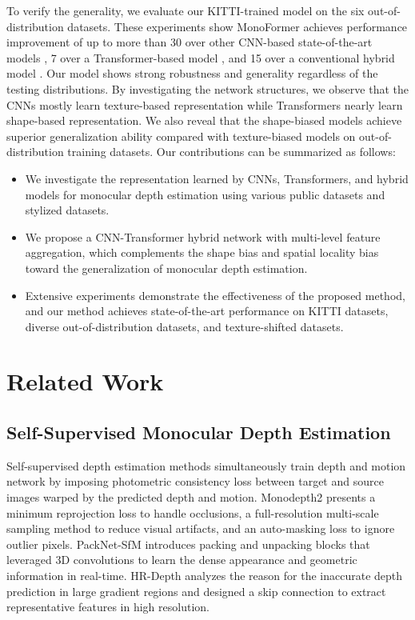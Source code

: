 \documentclass[letterpaper]{article} \usepackage{aaai23}  \usepackage{times}  \usepackage{helvet}  \usepackage{courier}  \usepackage[hyphens]{url}  \usepackage{graphicx} \urlstyle{rm} \def\UrlFont{\rm}  \usepackage{natbib}  \usepackage{caption} \frenchspacing  \setlength{\pdfpagewidth}{8.5in} \setlength{\pdfpageheight}{11in} \usepackage{algorithm}
\begin{document}
To verify the generality, we evaluate our KITTI-trained model on the six out-of-distribution datasets.
These experiments show MonoFormer achieves performance improvement of up to more than 30 over other CNN-based state-of-the-art models \cite{godard2019digging,zhou2021r,guizilini20203d}, 7 over a Transformer-based model \cite{dosovitskiy2020image}, and 15 over a conventional hybrid model \cite{yang2021transformer}. Our model shows strong robustness and generality regardless of the testing distributions.
By investigating the network structures, we observe that the CNNs mostly learn texture-based representation while Transformers nearly learn shape-based representation. 
We also reveal that the shape-biased models achieve superior generalization ability compared with texture-biased models on out-of-distribution training datasets. 
Our contributions can be summarized as follows:
\begin{itemize}
    \item We investigate the representation learned by CNNs, Transformers, and hybrid models for monocular depth estimation
    using various public datasets and stylized datasets. 
    \item We propose a CNN-Transformer hybrid network with multi-level feature aggregation, which complements the shape bias and spatial locality bias toward the generalization of monocular depth estimation.
    \item Extensive experiments demonstrate the effectiveness of the proposed method, and our method achieves state-of-the-art performance on KITTI datasets, diverse out-of-distribution datasets, and texture-shifted datasets.
\end{itemize}

\section{Related Work}

\subsection{Self-Supervised Monocular Depth Estimation}
Self-supervised depth estimation methods \cite{zhou2017unsupervised,godard2019digging,guizilini20203d,lyu2020hr,klingner2020self,xiong2021self} simultaneously train depth and motion network by imposing photometric consistency loss between target and source images warped by the predicted depth and motion.
Monodepth2 \cite{godard2019digging} presents a minimum reprojection loss to handle occlusions, a full-resolution multi-scale sampling method to reduce visual artifacts, and an auto-masking loss to ignore outlier pixels. 
PackNet-SfM \cite{guizilini20203d} introduces packing and unpacking blocks that leveraged 3D convolutions to learn the dense appearance and geometric information in real-time. 
HR-Depth \cite{lyu2020hr} analyzes the reason for the inaccurate depth prediction in large gradient regions and designed a skip connection to extract representative features in high resolution.
\end{document}
